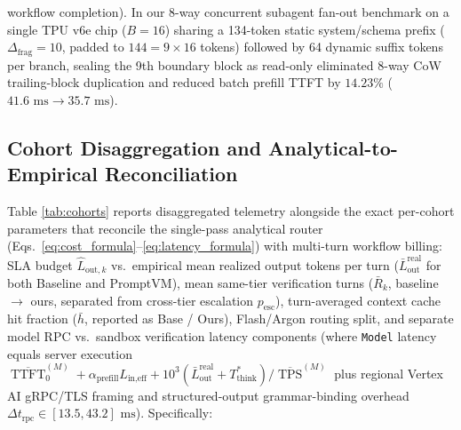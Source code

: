\documentclass[conference,10pt]{IEEEtran}
\begin{document}
workflow completion). In our 8-way concurrent subagent fan-out benchmark on a single TPU v6e chip ($B=16$) sharing a 134-token static system/schema prefix ($\Delta_{\text{frag}}=10$, padded to $144 = 9 \times 16$ tokens) followed by 64 dynamic suffix tokens per branch, sealing the 9th boundary block as read-only eliminated 8-way CoW trailing-block duplication and reduced batch prefill TTFT by $14.23\%$ ($41.6\text{ ms} \to 35.7\text{ ms}$).

\subsection{Cohort Disaggregation and Analytical-to-Empirical Reconciliation}
Table \ref{tab:cohorts} reports disaggregated telemetry alongside the exact per-cohort parameters that reconcile the single-pass analytical router (Eqs.~\ref{eq:cost_formula}--\ref{eq:latency_formula}) with multi-turn workflow billing: SLA budget $\hat{L}_{\text{out},k}$ vs.\ empirical mean realized output tokens per turn ($\bar{L}_{\text{out}}^{\text{real}}$ for both Baseline and PromptVM), mean same-tier verification turns ($\bar{R}_k$, baseline $\to$ ours, separated from cross-tier escalation $p_{\text{esc}}$), turn-averaged context cache hit fraction ($\bar{h}$, reported as Base / Ours), Flash/Argon routing split, and separate model RPC vs.\ sandbox verification latency components (where \texttt{Model} latency equals server execution $\overline{\operatorname{TTFT}}_0^{(M)} + \alpha_{\text{prefill}} L_{\text{in,eff}} + 10^3(\bar{L}_{\text{out}}^{\text{real}} + T_{\text{think}}^*)/\overline{\operatorname{TPS}}^{(M)}$ plus regional Vertex AI gRPC/TLS framing and structured-output grammar-binding overhead $\Delta t_{\text{rpc}} \in [13.5, 43.2]\text{ ms}$). Specifically:
\end{document}
